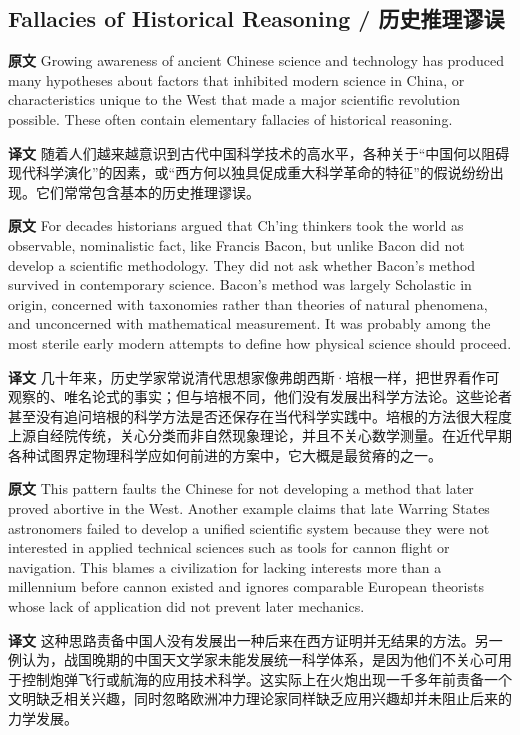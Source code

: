 \documentclass[UTF8,zihao=-4]{ctexart}
\newcommand{\BodyFont}{\fontsize{10.5pt}{15.5pt}\selectfont}
\newcommand{\origlabel}{\textbf{原文}\quad}
\newcommand{\translabel}{\textbf{译文}\quad}
\newenvironment{enblock}{\par\noindent\begingroup\BodyFont\origlabel}{\par\endgroup}
\newenvironment{zhblock}{\par\noindent\begingroup\BodyFont\translabel}{\par\endgroup\vspace{0.35em}}
\begin{document}
\subsection*{Fallacies of Historical Reasoning / 历史推理谬误}

\begin{enblock}
Growing awareness of ancient Chinese science and technology has produced many hypotheses about factors that inhibited modern science in China, or characteristics unique to the West that made a major scientific revolution possible. These often contain elementary fallacies of historical reasoning.
\end{enblock}
\begin{zhblock}
随着人们越来越意识到古代中国科学技术的高水平，各种关于“中国何以阻碍现代科学演化”的因素，或“西方何以独具促成重大科学革命的特征”的假说纷纷出现。它们常常包含基本的历史推理谬误。
\end{zhblock}

\begin{enblock}
For decades historians argued that Ch'ing thinkers took the world as observable, nominalistic fact, like Francis Bacon, but unlike Bacon did not develop a scientific methodology. They did not ask whether Bacon's method survived in contemporary science. Bacon's method was largely Scholastic in origin, concerned with taxonomies rather than theories of natural phenomena, and unconcerned with mathematical measurement. It was probably among the most sterile early modern attempts to define how physical science should proceed.
\end{enblock}
\begin{zhblock}
几十年来，历史学家常说清代思想家像弗朗西斯·培根一样，把世界看作可观察的、唯名论式的事实；但与培根不同，他们没有发展出科学方法论。这些论者甚至没有追问培根的科学方法是否还保存在当代科学实践中。培根的方法很大程度上源自经院传统，关心分类而非自然现象理论，并且不关心数学测量。在近代早期各种试图界定物理科学应如何前进的方案中，它大概是最贫瘠的之一。
\end{zhblock}

\begin{enblock}
This pattern faults the Chinese for not developing a method that later proved abortive in the West. Another example claims that late Warring States astronomers failed to develop a unified scientific system because they were not interested in applied technical sciences such as tools for cannon flight or navigation. This blames a civilization for lacking interests more than a millennium before cannon existed and ignores comparable European theorists whose lack of application did not prevent later mechanics.
\end{enblock}
\begin{zhblock}
这种思路责备中国人没有发展出一种后来在西方证明并无结果的方法。另一例认为，战国晚期的中国天文学家未能发展统一科学体系，是因为他们不关心可用于控制炮弹飞行或航海的应用技术科学。这实际上在火炮出现一千多年前责备一个文明缺乏相关兴趣，同时忽略欧洲冲力理论家同样缺乏应用兴趣却并未阻止后来的力学发展。
\end{zhblock}
\end{document}
